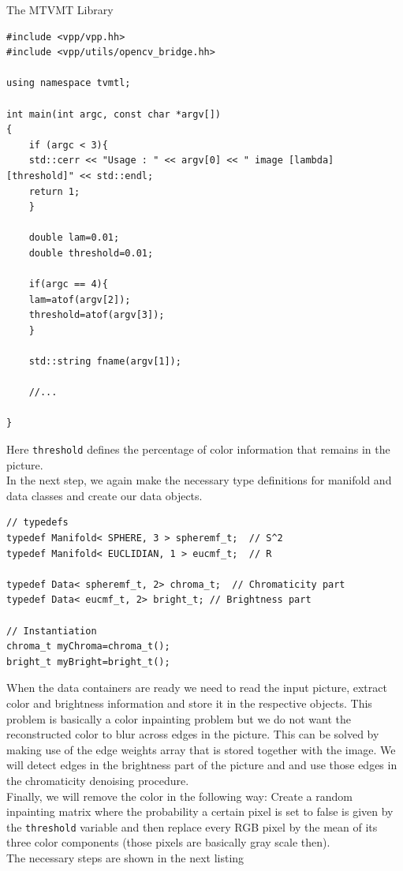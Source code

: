 \begin{chapter}{The MTVMT Library}
\begin{lstlisting}[label=code:tut2_init,caption={Include library files and read parameters from standard input}]
#include <vpp/vpp.hh>
#include <vpp/utils/opencv_bridge.hh>

using namespace tvmtl;

int main(int argc, const char *argv[])
{
    if (argc < 3){
	std::cerr << "Usage : " << argv[0] << " image [lambda] [threshold]" << std::endl;
	return 1;
    }

    double lam=0.01;
    double threshold=0.01;

    if(argc == 4){
	lam=atof(argv[2]);
	threshold=atof(argv[3]);
    }   

    std::string fname(argv[1]);

    //...

}
\end{lstlisting}
Here \texttt{threshold} defines the percentage of color information that remains in the picture.\\
In the next step, we again make the necessary type definitions for manifold and data classes and create our data objects.

\cppinline
\begin{lstlisting}[label=code:tut2_mfdata,caption={Manifold and Data class type definitions and instantiation}]
// typedefs
typedef Manifold< SPHERE, 3 > spheremf_t;  // S^2
typedef Manifold< EUCLIDIAN, 1 > eucmf_t;  // R
 
typedef Data< spheremf_t, 2> chroma_t;	// Chromaticity part
typedef Data< eucmf_t, 2> bright_t;	// Brightness part

// Instantiation
chroma_t myChroma=chroma_t();
bright_t myBright=bright_t();
\end{lstlisting}

When the data containers are ready we need to read the input picture, extract color and brightness information and store it in the respective objects.
This problem is basically a color inpainting problem but we do not want the reconstructed color to blur across edges in the picture. This can be solved
by making use of the edge weights array that is stored together with the image. We will detect edges in the brightness part of the picture and and
use those edges in the chromaticity denoising procedure.\\
Finally, we will remove the color in the following way: Create a random inpainting matrix where the probability a certain pixel is set to false is given
by the \texttt{threshold} variable and then replace every RGB pixel by the mean of its three color components (those pixels are basically gray scale then).\\
The necessary steps are shown in the next listing


\end{chapter}
